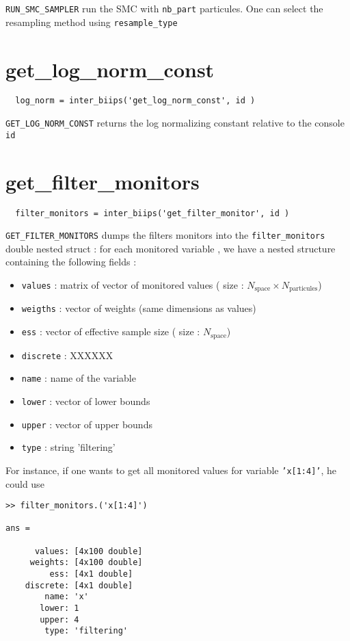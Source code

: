 \documentclass[11pt]{article}
\begin{document}
  \texttt{RUN\_SMC\_SAMPLER} run the SMC with \texttt{nb\_part} particules. One can select the resampling method using \texttt{resample\_type}
  \section{get\_log\_norm\_const}

 \begin{lstlisting}
  log_norm = inter_biips('get_log_norm_const', id )
 \end{lstlisting}
 \texttt{GET\_LOG\_NORM\_CONST} returns the log normalizing constant relative to the console \texttt{id}

 \section{get\_filter\_monitors}

 \begin{lstlisting}
  filter_monitors = inter_biips('get_filter_monitor', id )
 \end{lstlisting}

 \texttt{GET\_FILTER\_MONITORS} dumps the filters monitors into the \texttt{filter\_monitors} double nested struct : for each monitored variable , we have
  a nested structure containing the following fields :
  \begin{itemize}
   \item \texttt{values} : matrix of vector of monitored values ( size : $N_{\mbox{space}} \times N_{\mbox{particules}}$)
   \item \texttt{weigths} : vector of weights (same dimensions as values)
   \item \texttt{ess} : vector of effective  sample size ( size : $N_{\mbox{space}}$)
   \item \texttt{discrete} : XXXXXX
   \item \texttt{name} : name of the variable
   \item \texttt{lower} : vector of lower bounds
   \item \texttt{upper} : vector of upper bounds
   \item \texttt{type} : string  'filtering'
   \end{itemize}

  For instance, if one wants to get all monitored values for variable \texttt{'x[1:4]'}, he could use
 \begin{lstlisting}
>> filter_monitors.('x[1:4]') 

ans = 

      values: [4x100 double]
     weights: [4x100 double]
         ess: [4x1 double]
    discrete: [4x1 double]
        name: 'x'
       lower: 1
       upper: 4
        type: 'filtering'
 
 \end{lstlisting}
\end{document}

